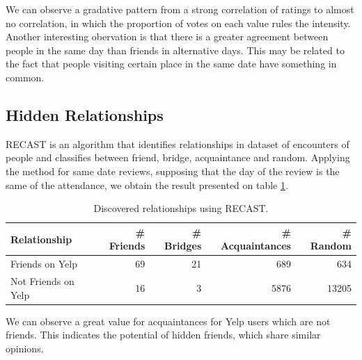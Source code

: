 We can observe a gradative pattern from a strong correlation of ratings to
almost no correlation, in which the proportion of votes on each value rules
the intensity. Another interesting obervation is that there is a greater
agreement between people in the same day than friends in alternative days. This
may be related to the fact that people visiting certain place in the same date
have something in common.

\subsection{Hidden Relationships}
RECAST\cite{} is an algorithm that identifies relationships in dataset of
encounters of people and classifies between friend, bridge, acquaintance and
random. Applying the method for same date reviews, supposing that the day of
the review is the same of the attendance, we obtain the result presented on
table \ref{tab:recast}.

\begin{table}[H]
\begin{tabular}{l|rrrr}
Relationship & \# Friends & \# Bridges & \# Acquaintances & \# Random \\ 
\hline
Friends on Yelp & 69 & 21 & 689 & 634 \\
Not Friends on Yelp & 16 & 3 & 5876 & 13205 \\
\end{tabular}
\caption{Discovered relationships using RECAST.}
\label{tab:recast}
\end{table}

We can observe a great value for acquaintances for Yelp users which are not
friends. This indicates the potential of hidden friends, which share similar
opinions.
